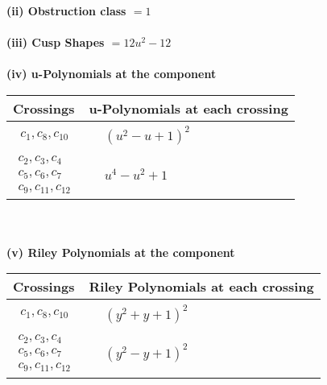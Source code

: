 \documentclass[1p]{elsarticle_modified}
\theoremstyle{definition}
\begin{document}
\flushleft \textbf{(ii) Obstruction class $= 1$}\\~\\
\flushleft \textbf{(iii) Cusp Shapes $= 12 u^2-12$}\\~\\
\newpage\renewcommand{\arraystretch}{1}
\flushleft \textbf{(iv) u-Polynomials at the component}\newline \\
\begin{tabular}{m{50pt}|m{274pt}}
Crossings & \hspace{64pt}u-Polynomials at each crossing \\
\hline $$\begin{aligned}c_{1},c_{8},c_{10}\end{aligned}$$&$\begin{aligned}
&(u^2- u+1)^2
\end{aligned}$\\
\hline $$\begin{aligned}c_{2},c_{3},c_{4}\\c_{5},c_{6},c_{7}\\c_{9},c_{11},c_{12}\end{aligned}$$&$\begin{aligned}
&u^4- u^2+1
\end{aligned}$\\
\hline
\end{tabular}\\~\\
\newpage\renewcommand{\arraystretch}{1}
\flushleft \textbf{(v) Riley Polynomials at the component}\newline \\
\begin{tabular}{m{50pt}|m{274pt}}
Crossings & \hspace{64pt}Riley Polynomials at each crossing \\
\hline $$\begin{aligned}c_{1},c_{8},c_{10}\end{aligned}$$&$\begin{aligned}
&(y^2+y+1)^2
\end{aligned}$\\
\hline $$\begin{aligned}c_{2},c_{3},c_{4}\\c_{5},c_{6},c_{7}\\c_{9},c_{11},c_{12}\end{aligned}$$&$\begin{aligned}
&(y^2- y+1)^2
\end{aligned}$\\
\hline
\end{tabular}\\~\\
\end{document}
